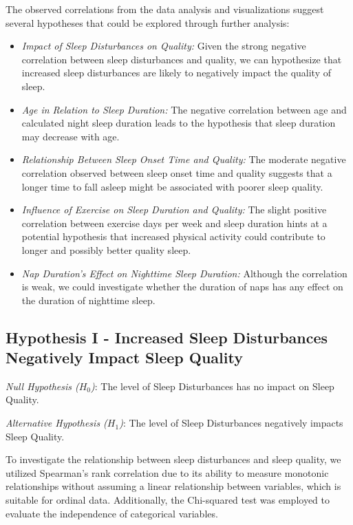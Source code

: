 \documentclass[conference]{IEEEtran}
\begin{document}
The observed correlations from the data analysis and visualizations suggest several hypotheses that could be explored through further analysis:
\begin{itemize}

    \item \textit{Impact of Sleep Disturbances on Quality:} Given the strong negative correlation between sleep disturbances and quality, we can hypothesize that increased sleep disturbances are likely to negatively impact the quality of sleep.

    \item \textit{Age in Relation to Sleep Duration:} The negative correlation between age and calculated night sleep duration leads to the hypothesis that sleep duration may decrease with age.

    \item \textit{Relationship Between Sleep Onset Time and Quality:} The moderate negative correlation observed between sleep onset time and quality suggests that a longer time to fall asleep might be associated with poorer sleep quality.

    \item \textit{Influence of Exercise on Sleep Duration and Quality:} The slight positive correlation between exercise days per week and sleep duration hints at a potential hypothesis that increased physical activity could contribute to longer and possibly better quality sleep.

    \item \textit{Nap Duration's Effect on Nighttime Sleep Duration:} Although the correlation is weak, we could investigate whether the duration of naps has any effect on the duration of nighttime sleep.
\end{itemize}
\subsection*{Hypothesis I - Increased Sleep Disturbances Negatively Impact Sleep Quality}
\textit{Null Hypothesis (\(H_0\))}: The level of Sleep Disturbances has no impact on Sleep Quality.

\textit{Alternative Hypothesis (\(H_1\))}: The level of Sleep Disturbances negatively impacts Sleep Quality.

To investigate the relationship between sleep disturbances and sleep quality, we utilized Spearman's rank correlation due to its ability to measure monotonic relationships without assuming a linear relationship between variables, which is suitable for ordinal data. Additionally, the Chi-squared test was employed to evaluate the independence of categorical variables.
\end{document}
